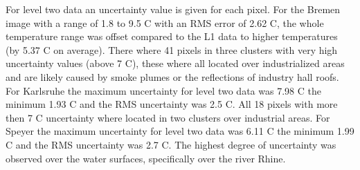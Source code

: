 \documentclass[a4paper, english]{article}
\begin{document}
For level two data an uncertainty value is given for each pixel. 
For the Bremen image with a range of 1.8 \textdegree to 9.5 \textdegree C with an RMS error of 2.62 \textdegree C, the whole temperature range was offset compared to the L1 data to higher temperatures (by 5.37 \textdegree C on average).
There where 41 pixels in three clusters with very high uncertainty values (above 7 \textdegree C), these where all located over industrialized areas and are likely caused by smoke plumes or the reflections of industry hall roofs. %
For Karlsruhe the maximum uncertainty for level two data was 7.98 \textdegree C the minimum 1.93 \textdegree C and the RMS uncertainty was 2.5 \textdegree C.
All 18 pixels with more then 7 \textdegree C uncertainty where located in two clusters over industrial areas.
For Speyer the maximum uncertainty for level two data was 6.11 \textdegree C the minimum 1.99 \textdegree C and the RMS uncertainty was 2.7 \textdegree C.
The highest degree of uncertainty was observed over the water surfaces, specifically over the river Rhine. 
\newpage
\end{document}

